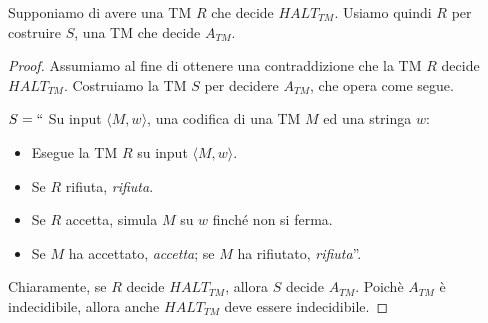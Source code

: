 \documentclass[12pt]{report}
\begin{document}
Supponiamo di avere una TM $R$ che decide $HALT_{TM}$. Usiamo quindi $R$ per costruire $S$, una TM che decide $A_{TM}$.
\begin{proof}
Assumiamo al fine di ottenere una contraddizione che la TM $R$ decide $HALT_{TM}$. Costruiamo la TM $S$ per decidere $A_{TM}$, che opera come segue.

$S = ``$ Su input $\langle M, w \rangle$, una codifica di una TM $M$ ed una stringa $w$:
\begin{itemize}
	\item Esegue la TM $R$ su input $\langle M, w \rangle$.
	\item Se $R$ rifiuta, \textit{rifiuta}.
	\item Se $R$ accetta, simula $M$ su $w$ finché non si ferma.
	\item Se $M$ ha accettato, \textit{accetta}; se $M$ ha rifiutato, \textit{rifiuta}''.
\end{itemize}
Chiaramente, se $R$ decide $HALT_{TM}$, allora $S$ decide $A_{TM}$. Poichè $A_{TM}$ è indecidibile, allora anche $HALT_{TM}$ deve essere indecidibile.
\end{proof}
\end{document}
